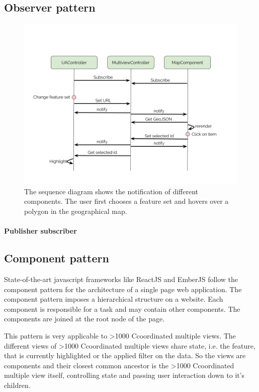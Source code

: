 \documentclass{article}
\newcommand\hmm[1]{\ifnum\ifhmode\spacefactor\else2000\fi>1000 \uppercase{#1}\else#1\fi}
\newcommand{\cmv}{\hmm{c}oordinated multiple view}
\newcommand{\cmvs}{\hmm{c}oordinated multiple views}
\begin{document}
\subsection{Observer pattern}
\begin{figure}[h!]
  \centering
  \includegraphics[width=\textwidth]{images/sequence-diagram.png}
  \caption{The sequence diagram shows the notification of different components.
  The user first chooses a feature set and hovers over a polygon in the geographical map.}
  \label{fig:implementation:sequence-diagram}
\end{figure}

\paragraph{Publisher subscriber}

\subsection{Component pattern}
State-of-the-art javascript frameworks like ReactJS and EmberJS follow the component pattern for the architecture of a single page web application.
The component pattern imposes a hierarchical structure on a website.
Each component is responsible for a task and may contain other components.
The components are joined at the root node of the page.

This pattern is very applicable to \cmvs{}.
The different views of \cmvs{} share state, i.e. the feature, that is currently highlighted or the applied filter on the data.
So the views are components and their closest common ancestor is the \cmv{} itself, controlling state and passing user interaction down to it's children.
\end{document}
